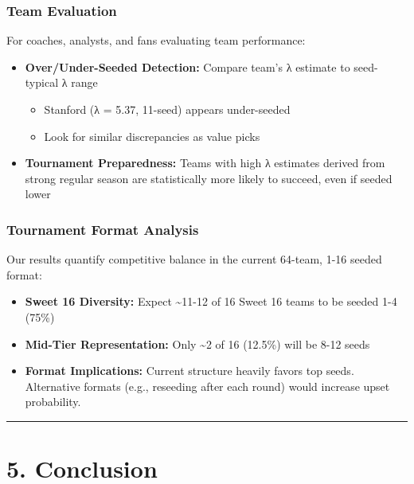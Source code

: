 \documentclass[
]{article}
\providecommand{\tightlist}{%
  \setlength{\itemsep}{0pt}\setlength{\parskip}{0pt}}
\begin{document}
\subsubsection{Team Evaluation}\label{team-evaluation}

For coaches, analysts, and fans evaluating team performance:

\begin{itemize}
\tightlist
\item
  \textbf{Over/Under-Seeded Detection:} Compare team's λ estimate to
  seed-typical λ range

  \begin{itemize}
  \tightlist
  \item
    Stanford (λ = 5.37, 11-seed) appears under-seeded
  \item
    Look for similar discrepancies as value picks
  \end{itemize}
\item
  \textbf{Tournament Preparedness:} Teams with high λ estimates derived
  from strong regular season are statistically more likely to succeed,
  even if seeded lower
\end{itemize}

\subsubsection{Tournament Format
Analysis}\label{tournament-format-analysis}

Our results quantify competitive balance in the current 64-team, 1-16
seeded format:

\begin{itemize}
\tightlist
\item
  \textbf{Sweet 16 Diversity:} Expect \textasciitilde11-12 of 16 Sweet
  16 teams to be seeded 1-4 (75\%)
\item
  \textbf{Mid-Tier Representation:} Only \textasciitilde2 of 16 (12.5\%)
  will be 8-12 seeds
\item
  \textbf{Format Implications:} Current structure heavily favors top
  seeds. Alternative formats (e.g., reseeding after each round) would
  increase upset probability.
\end{itemize}

\begin{center}\rule{0.5\linewidth}{0.5pt}\end{center}

\section{5. Conclusion}\label{conclusion}
\end{document}

